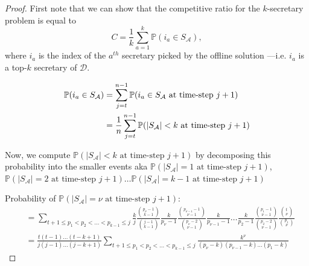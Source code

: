 \begin{proof}
First note that we can show that the competitive ratio for the $k$-secretary problem is equal to 
\begin{equation}
    C = \frac{1}{k}\sum_{a=1}^k \mathbb{P}(i_a \in S_\mathcal{A}), \label{eq:C_as_sum_prob1}
\end{equation}
where $i_a$ is the index of the $a^{th}$ secretary picked by the offline solution ---i.e. $i_a$ is a top-$k$ secretary of $\mathcal{D}$. 

\begin{align}
    \mathbb{P}(i_a \in S_\mathcal{A}) 
    &= \sum_{j=t}^{n-1} \mathbb{P}(i_a \in S_\mathcal{A} \text{ at time-step }j+1) \label{p_picked_equal_not_filled} \\
    &= \frac{1}{n}\sum_{j=t}^{n-1} \mathbb{P}(|S_{\mathcal{A}}| < k \text{ at time-step } j + 1) \notag
\end{align}

Now, we compute $\mathbb{P}(|S_{\mathcal{A}}| < k \text{ at time-step } j+1)$ by decomposing this probability into the smaller events aka $\mathbb{P}(|S_{\mathcal{A}}| = 1 \text{ at time-step } j+1)$, $\mathbb{P}(|S_{\mathcal{A}}| = 2 \text{ at time-step } j+1)\dots \mathbb{P}(|S_{\mathcal{A}}| = k - 1 \text{ at time-step } j+1)$

Probability of $\mathbb{P}(|S_{\mathcal{A}}| = \nu \text{ at time-step } j+1):$
\begin{align}
    &= \sum_{t+1 \leq p_1 < p_2 < \dots <p_{k-1} \leq j}\frac{k}{j} \frac{{p_{\nu} - 1 \choose k-1}}{{j-1 \choose k-1}}\frac{k}{p_{\nu} - 1}
    \frac{{p_{{\nu}-1} - 1 \choose \nu - 1}}{{p_{\nu} - 2 \choose \nu - 1}}\frac{k}{p_{\nu-1} - 1}\dots \frac{k}{p_2 - 1}\frac{{p_1 - 1 \choose \nu - 1}}{{p_2 - 2 \choose \nu - 1}} \frac{{t \choose \nu}}{{p_1 \choose \nu}}\\
    & = \frac{t(t-1)\dots(t-k+1)}{j(j-1)\dots (j - k + 1)}\sum_{t+1 \leq p_1 < p_2 < \dots <p_{k-1} \leq j}
    \frac{k^{\nu}}{(p_\nu-k)(p_{\nu-1} - k)\dots(p_1 - k)}
\end{align}


\end{proof}
